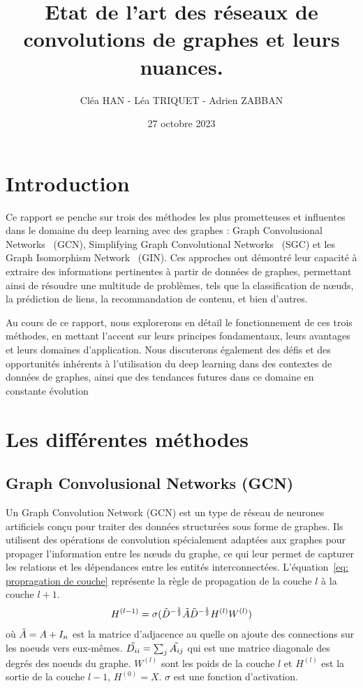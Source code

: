 \documentclass[a4paper]{article}
\title{Etat de l'art des réseaux de convolutions de graphes et leurs nuances.}
\author{Cléa HAN - Léa TRIQUET - Adrien ZABBAN}
\date{27 octobre 2023}
\begin{document}
\maketitle

\section{Introduction}

Ce rapport se penche sur trois des méthodes les plus prometteuses et influentes dans le domaine du deep learning avec des graphes : Graph Convolusional Networks~\cite{DBLP:journals/corr/KipfW16} (GCN), Simplifying Graph Convolutional Networks~\cite{DBLP:journals/corr/abs-1902-07153} (SGC) et les  Graph Isomorphism Network~\cite{DBLP:journals/corr/abs-1810-00826} (GIN). Ces approches ont démontré leur capacité à extraire des informations pertinentes à partir de données de graphes, permettant ainsi de résoudre une multitude de problèmes, tels que la classification de nœuds, la prédiction de liens, la recommandation de contenu, et bien d'autres.

Au cours de ce rapport, nous explorerons en détail le fonctionnement de ces trois méthodes, en mettant l'accent sur leurs principes fondamentaux, leurs avantages et leurs domaines d'application. Nous discuterons également des défis et des opportunités inhérents à l'utilisation du deep learning dans des contextes de données de graphes, ainsi que des tendances futures dans ce domaine en constante évolution

\section{Les différentes méthodes}

\subsection{Graph Convolusional Networks (GCN)}\label{sec: GCN}
Un Graph Convolution Network (GCN) est un type de réseau de neurones artificiels conçu pour traiter des données 
structurées sous forme de graphes. Ils utilisent des opérations de convolution spécialement adaptées aux graphes 
pour propager l'information entre les nœuds du graphe, ce qui leur permet de capturer les relations et les 
dépendances entre les entités interconnectées. L'équation~\ref{eq: propragation de couche} représente la règle de
propagation de la couche $l$ à la couche $l+1$.
\begin{equation}
    H^{(l-1)} = \sigma (\Tilde{D}^{-\frac{1}{2}} \Tilde{A} \Tilde{D}^{-\frac{1}{2}} H^{(l)} W^{(l)})
    \label{eq: propragation de couche}
\end{equation}
où $\Tilde{A}=A+I_n$ est la matrice d'adjacence au quelle on ajoute des connections sur les noeuds vers 
eux-mêmes. $\Tilde{D_{ii}}=\sum_j{\Tilde{A_{ij}}}$ qui est une matrice diagonale des degrés des noeuds du 
graphe. $W^{(l)}$ sont les poids de la couche $l$ et $H^{(l)}$ est la sortie de la couche $l-1$, $H^{(0)}=X$. 
$\sigma$ est une fonction d'activation.
\end{document}
